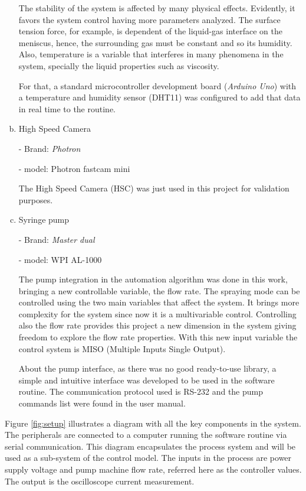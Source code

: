 \begin{enumerate}[a)]
  The stability of the system is affected by many physical effects. Evidently, it favors the system control having more parameters analyzed.
  The surface tension force, for example, is dependent of the liquid-gas interface on the meniscus, hence, the surrounding gas must be constant and so its humidity.
  Also, temperature is a variable that interferes in many phenomena in the system, specially the liquid properties such as viscosity.

  For that, a standard microcontroller development board (\emph{Arduino Uno}) with a temperature and humidity sensor (DHT11) was configured to add that data in real time to the routine.

  \item High Speed Camera 
  
  - Brand: \emph{Photron}

  - model: Photron fastcam mini

  The High Speed Camera (HSC) was just used in this project for validation purposes.
  
  \item Syringe pump
  
  - Brand: \emph{Master dual}

  - model: WPI AL-1000

  The pump integration in the automation algorithm was done in this work, bringing a new controllable variable, the flow rate. The spraying mode can be controlled using the two main variables that affect the system. 
  It brings more complexity for the system since now it is a multivariable control.
  Controlling also the flow rate provides this project a new dimension in the system giving freedom to explore the flow rate properties.
  With this new input variable the control system is MISO (Multiple Inputs Single Output).

  About the pump interface, as there was no good ready-to-use library, a simple and intuitive interface was developed to be used in the software routine.
  The communication protocol used is RS-232 and the pump commands list were found in the user manual.


  \end{enumerate}


Figure \ref{fig:setup} illustrates a diagram with all the key components in the system. The peripherals are connected to a computer running the software routine via serial communication. 
This diagram encapsulates the process system and will be used as a sub-system of the control model. The inputs in the process are power supply voltage and pump machine flow rate, referred here as the controller values. The output is the oscilloscope current measurement.

